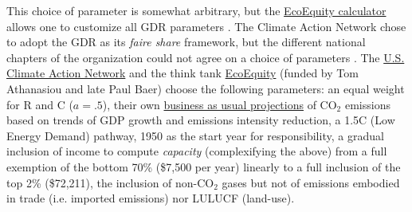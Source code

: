 This choice of parameter is somewhat arbitrary, but the \href{https://climateequityreference.org}{EcoEquity calculator} allows one to customize all GDR parameters \citep{holz_climate_2019}. The Climate Action Network chose to adopt the GDR as its \textit{faire share} framework, but the different national chapters of the organization could not agree on a choice of parameters \citep{athanasiou_fair_2022}. %
The \href{https://usfairshare.org/}{U.S. Climate Action Network} and the think tank \href{https://www.ecoequity.org/about/}{EcoEquity} (funded by Tom Athanasiou and late Paul Baer) choose the following parameters: an equal weight for R and C ($a=.5$), their own \href{https://climateequityreference.org/calculator-information/gdp-and-emissions-baselines/}{business as usual projections} of CO$_\text{2}$ emissions based on trends of GDP growth and emissions intensity reduction,  %
a 1.5\textdegree{}C (Low Energy Demand) pathway, 1950 as the start year for responsibility, a gradual inclusion of income to compute \textit{capacity} (complexifying the above) from a full exemption of the bottom 70\% (\$7,500 per year) linearly to a full inclusion of the top 2\% (\$72,211), the inclusion of non-CO$_\text{2}$ gases but not of emissions embodied in trade (i.e. imported emissions) nor LULUCF (land-use). 

